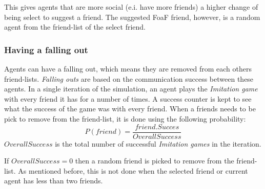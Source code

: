 This gives agents that are more social (e.i. have more friends) a higher change of being select to suggest a friend.
The suggested FoaF friend, however, is a random agent from the friend-list of the select friend.

\subsubsection{Having a falling out}
Agents can have a falling out, which means they are removed from each others friend-lists.
\textit{Falling outs} are based on the communication success between these agents.
In a single iteration of the simulation, an agent plays the \textit{Imitation game} with every friend it has for a number of times.
A success counter is kept to see what the success of the game was with every friend.
When a friends needs to be pick to remove from the friend-list, it is done using the following probability:
\begin{equation}
    P(friend) = \frac{friend.Succes}{OverallSuccess}
\end{equation}
$OverallSuccess$ is the total number of successful \textit{Imitation games} in the iteration.

If $OverallSuccess = 0$ then a random friend is picked to remove from the friend-list.
As mentioned before, this is not done when the selected friend or current agent has less than two friends.